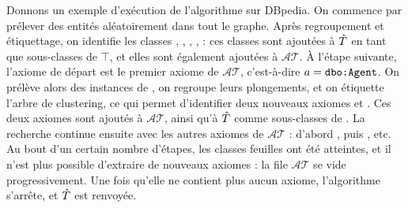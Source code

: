 Donnons un exemple d'exécution de l'algorithme sur DBpedia.
On commence par prélever des entités aléatoirement dans tout le graphe. Après regroupement et étiquettage, on identifie les classes , , , ,  : ces classes sont ajoutées à $\hat{T}$ en tant que sous-classes de $\top$, et elles sont également ajoutées à $\mathcal{AT}$. À l'étape suivante, l'axiome de départ est le premier axiome de $\mathcal{AT}$, c'est-à-dire $a = \texttt{dbo:Agent}$. On prélève alors des instances de , on regroupe leurs plongements, et on étiquette l'arbre de clustering, ce qui permet d'identifier deux nouveaux axiomes  et . Ces deux axiomes sont ajoutés à $\mathcal{AT}$, ainsi qu'à $\hat{T}$ comme sous-classes de . %
La recherche continue ensuite avec les autres axiomes de $\mathcal{AT}$ : d'abord , puis , etc. Au bout d'un certain nombre d'étapes, les classes feuilles ont été atteintes, et il n'est plus possible d'extraire de nouveaux axiomes : la file $\mathcal{AT}$ se vide progressivement. Une fois qu'elle ne contient plus aucun axiome, l'algorithme s'arrête, et $\hat{T}$ est renvoyée.

